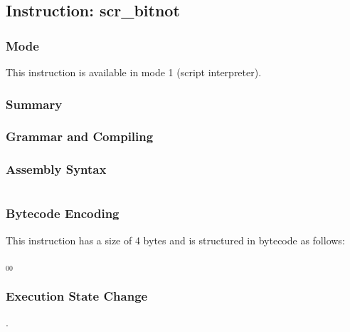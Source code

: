 \subsection{Instruction: scr\_bitnot}

\subsubsection{Mode}
This instruction is available in mode 1 (script interpreter).
\subsubsection{Summary}


\subsubsection{Grammar and Compiling}


\subsubsection{Assembly Syntax}

\begin{myquote}
\begin{verbatim}

\end{verbatim}
\end{myquote}

\subsubsection{Bytecode Encoding}

This instruction has a size of 4 bytes and is structured in bytecode as follows:

$_{00}$\ 

\subsubsection{Execution State Change}

.


